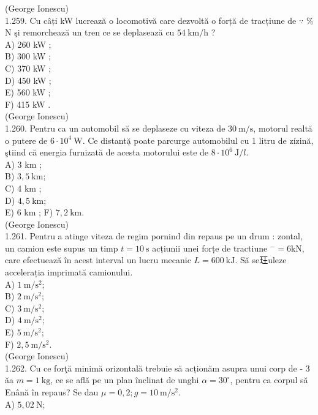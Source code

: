 \documentclass[10pt]{article}
\begin{document}
(George Ionescu)\\
1.259. Cu câți kW lucrează o locomotivă care dezvoltă o forță de tracțiune de $\because$ \% N şi remorchează un tren ce se deplasează cu $54 \mathrm{~km} / \mathrm{h}$ ?\\
A) 260 kW ;\\
B) 300 kW ;\\
C) 370 kW ;\\
D) 450 kW ;\\
E) 560 kW ;\\
F) 415 kW .\\
(George Ionescu)\\
1.260. Pentru ca un automobil să se deplaseze cu viteza de $30 \mathrm{~m} / \mathrm{s}$, motorul realtă o putere de $6 \cdot 10^{4} \mathrm{~W}$. Ce distantặ poate parcurge automobilul cu 1 litru de zízină, ştiind că energia furnizată de acesta motorului este de $8 \cdot 10^{6} \mathrm{~J} / l$.\\
A) 3 km ;\\
B) $3,5 \mathrm{~km}$;\\
C) 4 km ;\\
D) $4,5 \mathrm{~km}$;\\
E) 6 km ; F) $7,2 \mathrm{~km}$.\\
(George Ionescu)\\
1.261. Pentru a atinge viteza de regim pornind din repaus pe un drum : zontal, un camion este supus un timp $t=10 \mathrm{~s}$ acțiunii unei forțe de tractiune ${ }^{-}=6 \mathrm{kN}$, care efectuează în acest interval un lucru mecanic $L=600 \mathrm{~kJ}$. Să se玨uleze accelerația imprimată camionului.\\
A) $1 \mathrm{~m} / \mathrm{s}^{2}$;\\
B) $2 \mathrm{~m} / \mathrm{s}^{2}$;\\
C) $3 \mathrm{~m} / \mathrm{s}^{2}$;\\
D) $4 \mathrm{~m} / \mathrm{s}^{2}$;\\
E) $5 \mathrm{~m} / \mathrm{s}^{2}$;\\
F) $2,5 \mathrm{~m} / \mathrm{s}^{2}$.\\
(George Ionescu)\\
1.262. Cu ce forţă minimă orizontală trebuie să acționăm asupra unui corp de - 3 ăa $m=1 \mathrm{~kg}$, ce se află pe un plan înclinat de unghi $\alpha=30^{\circ}$, pentru ca corpul să Enână în repaus? Se dau $\mu=0,2 ; g=10 \mathrm{~m} / \mathrm{s}^{2}$.\\
A) $5,02 \mathrm{~N}$;\\
\end{document}
